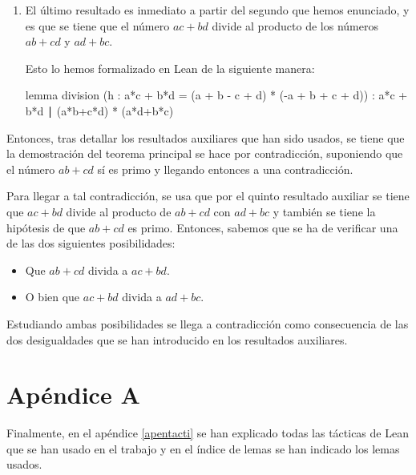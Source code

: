 \begin{enumerate}
\item El último resultado es inmediato a partir del segundo que hemos
  enunciado, y es que se tiene que el número \(ac+bd\) divide al
  producto de los números \(ab+cd\) y \(ad+bc\).

  Esto lo hemos formalizado en Lean de la siguiente manera:

  \begin{leancode}
  lemma division
    (h : a*c + b*d = (a + b - c + d) * (-a + b + c + d))
    : a*c + b*d ∣ (a*b+c*d) * (a*d+b*c)
  \end{leancode}

\end{enumerate}

Entonces, tras detallar los resultados auxiliares que han sido usados,
se tiene que la demostración del teorema principal se hace por
contradicción, suponiendo que el número \(ab+cd\) sí es primo y llegando
entonces a una contradicción.

Para llegar a tal contradicción, se usa que por el quinto resultado
auxiliar se tiene que \(ac+bd\) divide al producto de \(ab+cd\) con
\(ad+bc\) y también se tiene la hipótesis de que \(ab+cd\) es
primo. Entonces, sabemos que se ha de verificar una de las dos
siguientes posibilidades:
\begin{itemize}
\item Que \(ab+cd\) divida a \(ac+bd\).

\item O bien que \(ac+bd\) divida a \(ad+bc\).
\end{itemize}

Estudiando ambas posibilidades se llega a contradicción como
consecuencia de las dos desigualdades que se han introducido en los
resultados auxiliares.

\section{Apéndice A}

Finalmente, en el apéndice \ref{apentacti} se han explicado todas
las tácticas de Lean que se han usado en el trabajo y en el índice de
lemas se han indicado los lemas usados.



